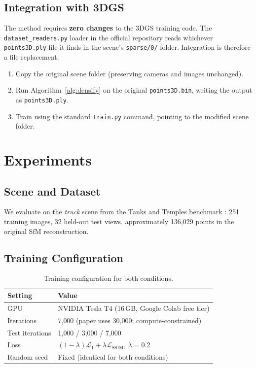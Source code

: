 \documentclass[12pt, a4paper]{article}
\begin{document}
\subsection{Integration with 3DGS}

The method requires \textbf{zero changes} to the 3DGS training code. The
\texttt{dataset\_readers.py} loader in the official repository reads whichever
\texttt{points3D.ply} file it finds in the scene's \texttt{sparse/0/} folder.
Integration is therefore a file replacement:

\begin{enumerate}
    \item Copy the original scene folder (preserving cameras and images unchanged).
    \item Run Algorithm~\ref{alg:densify} on the original \texttt{points3D.bin},
          writing the output as \texttt{points3D.ply}.
    \item Train using the standard \texttt{train.py} command, pointing to the
          modified scene folder.
\end{enumerate}

\section{Experiments}

\subsection{Scene and Dataset}

We evaluate on the \textit{truck} scene from the Tanks and Temples benchmark
\citep{knapitsch2017tanks}: 251 training images, 32 held-out test views,
approximately 136{,}029 points in the original SfM reconstruction.

\subsection{Training Configuration}

\begin{table}[h]
\centering
\caption{Training configuration for both conditions.}
\label{tab:config}
\begin{tabular}{ll}
\toprule
\textbf{Setting} & \textbf{Value} \\
\midrule
GPU & NVIDIA Tesla T4 (16\,GB, Google Colab free tier) \\
Iterations & 7{,}000 (paper uses 30{,}000; compute-constrained) \\
Test iterations & 1{,}000 / 3{,}000 / 7{,}000 \\
Loss & $(1-\lambda)\mathcal{L}_1 + \lambda\mathcal{L}_\text{SSIM}$, $\lambda=0.2$ \\
Random seed & Fixed (identical for both conditions) \\
\bottomrule
\end{tabular}
\end{table}
\end{document}
